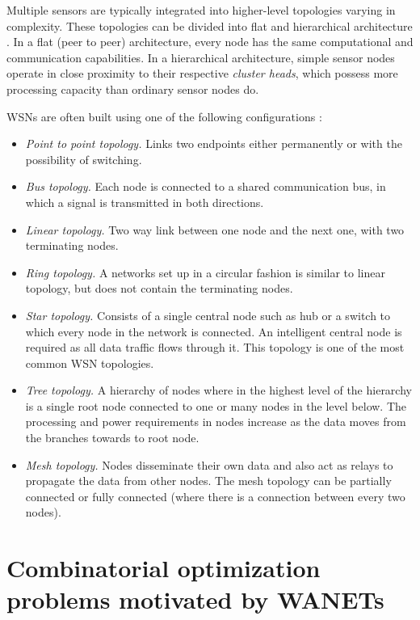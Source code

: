 Multiple sensors are typically integrated into higher-level topologies varying in complexity.
These topologies can be divided into flat and hierarchical architecture \cite{mcgrath13}.
In a flat (peer to peer) architecture, every node has the same computational and communication capabilities.
In a hierarchical architecture, simple sensor nodes operate in close proximity to their respective \emph{cluster heads},
which possess more processing capacity than ordinary sensor nodes do.

WSNs are often built using one of the following configurations \cite{mcgrath13}:

\begin{itemize}
\item \emph{Point to point topology.} Links two endpoints either permanently or with the possibility of switching.
\item \emph{Bus topology.} Each node is connected to a shared communication bus, in which a signal is transmitted in both directions. 
\item \emph{Linear topology.} Two way link between one node and the next one, with two terminating nodes.
\item \emph{Ring topology.} A networks set up in a circular fashion is similar to linear topology, but does not contain the terminating nodes.
\item \emph{Star topology.} Consists of a single central node such as hub or a switch to which every node in the network is connected. 
An intelligent central node is required as all data traffic flows through it.
This topology is one of the most common WSN topologies.
\item \emph{Tree topology.} A hierarchy of nodes where in the highest level of the hierarchy is a single root node connected to one or many nodes in the level below.
The processing and power requirements in nodes increase as the data moves from the branches towards to root node.
\item \emph{Mesh topology.} Nodes disseminate their own data and also act as relays to propagate the data from other nodes.
The mesh topology can be partially connected  or fully connected (where there is a connection between every two nodes).
\end{itemize}

\section{Combinatorial optimization problems motivated by WANETs}

